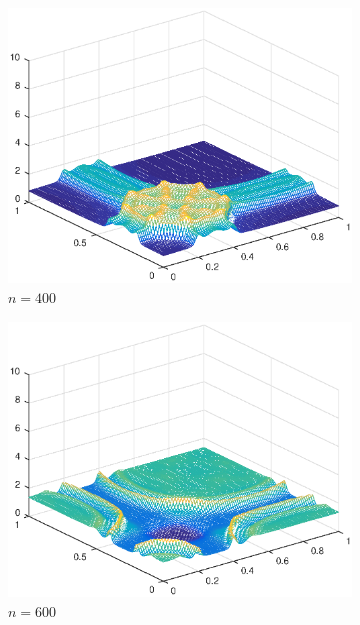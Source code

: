 \begin{figure}[h!]
    \begin{subfigure}[t]{0.48\textwidth}
        \centering
        \includegraphics[width=\textwidth]{images/sol_ri_0400_per.eps}
        \caption{$n=400$}
        \label{fig:100}
    \end{subfigure}
    \begin{subfigure}[t]{0.48\textwidth}
        \centering
        \includegraphics[width=\textwidth]{images/sol_ri_0600_per.eps}
        \caption{$n=600$}
        \label{fig:100}
    \end{subfigure}
    \begin{subfigure}[t]{0.48\textwidth}

\end{subfigure}
\end{figure}
